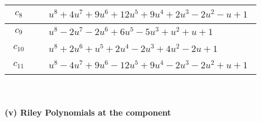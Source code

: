 \documentclass[1p]{elsarticle_modified}
\theoremstyle{definition}
\begin{document}
\begin{tabular}{m{50pt}|m{274pt}}
\hline $$\begin{aligned}c_{8}\end{aligned}$$&$\begin{aligned}
&u^8+4 u^7+9 u^6+12 u^5+9 u^4+2 u^3-2 u^2- u+1
\end{aligned}$\\
\hline $$\begin{aligned}c_{9}\end{aligned}$$&$\begin{aligned}
&u^8-2 u^7-2 u^6+6 u^5-5 u^3+u^2+u+1
\end{aligned}$\\
\hline $$\begin{aligned}c_{10}\end{aligned}$$&$\begin{aligned}
&u^8+2 u^6+u^5+2 u^4-2 u^3+4 u^2-2 u+1
\end{aligned}$\\
\hline $$\begin{aligned}c_{11}\end{aligned}$$&$\begin{aligned}
&u^8-4 u^7+9 u^6-12 u^5+9 u^4-2 u^3-2 u^2+u+1
\end{aligned}$\\
\hline
\end{tabular}\\~\\
\newpage\renewcommand{\arraystretch}{1}
\flushleft \textbf{(v) Riley Polynomials at the component}\newline \\
\end{document}
